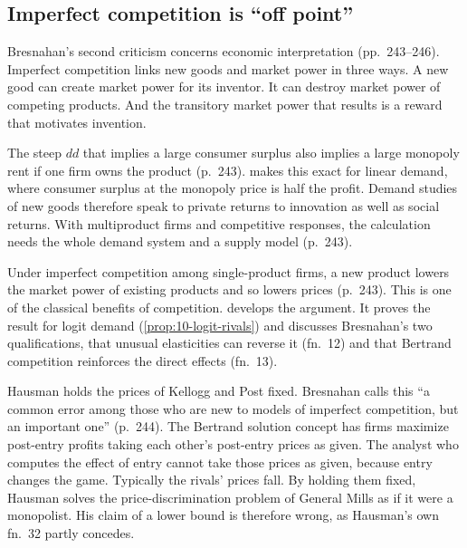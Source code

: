 \subsection{Imperfect competition is ``off point''}\label{sec:10-bresnahan-competition}

Bresnahan's second criticism concerns economic interpretation (pp.~243--246). Imperfect competition links
new goods and market power in three ways. A new good can create market power for its inventor. It can
destroy market power of competing products. And the transitory market power that results is a reward that
motivates invention.

The steep $dd$ that implies a large consumer surplus also implies a large monopoly rent if one firm owns the
product (p.~243).  makes this exact for linear demand, where consumer surplus at the
monopoly price is half the profit. Demand studies of new goods therefore speak to private returns to
innovation as well as social returns. With multiproduct firms and competitive responses, the calculation
needs the whole demand system and a supply model (p.~243).

Under imperfect competition among single-product firms, a new product lowers the market power of existing
products and so lowers prices (p.~243). This is one of the classical benefits of competition.
 develops the argument. It proves the result for logit demand
(\cref{prop:10-logit-rivals}) and discusses Bresnahan's two qualifications, that unusual elasticities can
reverse it (fn.~12) and that Bertrand competition reinforces the direct effects (fn.~13).

Hausman holds the prices of Kellogg and Post fixed. Bresnahan calls this ``a common error among those who
are new to models of imperfect competition, but an important one'' (p.~244). The Bertrand solution concept
has firms maximize post-entry profits taking each other's post-entry prices as given. The analyst who
computes the effect of entry cannot take those prices as given, because entry changes the game. Typically
the rivals' prices fall. By holding them fixed, Hausman solves the price-discrimination problem of General
Mills as if it were a monopolist. His claim of a lower bound is therefore wrong, as Hausman's own fn.~32
partly concedes.

